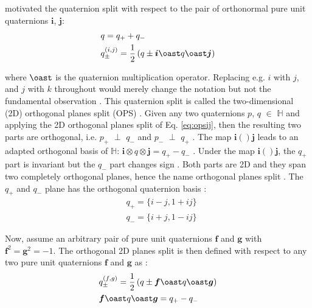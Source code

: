\documentclass[superscriptaddress,longbibliography,aps,prl,twocolumn,10pt]{revtex4-2}
\begin{document}
\noindent
motivated the quaternion split with respect to the pair of orthonormal pure unit quaternions $\boldsymbol{i}$, $\boldsymbol{j}$:
    \begin{equation} \label{eq:opsij}
    \begin{aligned}
        &q = q_{+}+q_{-} \\
        &q_{\pm}^{\left(i,j\right)} = \frac{1}{2} \left(q \pm \boldsymbol{i} \oast q \oast \boldsymbol{j} \right)
    \end{aligned}
    \end{equation}

\noindent
where $\oast$ is the quaternion multiplication operator. Replacing e.g. $i$ with $j$, and $j$ with $k$ throughout would merely change the notation but not the fundamental observation \cite{HitzerSangwine2013, Hitzer2015}. This quaternion split is called the two-dimensional (2D) orthogonal planes split (OPS) \cite{HitzerSangwine2013, Hitzer2015}. Given any two quaternions $p$, $q$ $\in$ $\mathbb{H}$ and applying the 2D orthogonal planes split of Eq. \ref{eq:opsij}, then the resulting two parts are orthogonal, i.e. $p_{+}$ $\perp$ $q_{-}$ and $p_{-}$ $\perp$ $q_{+}$ \cite{HitzerSangwine2013, Hitzer2015}. The map $\boldsymbol{i}()\boldsymbol{j}$ leads to an adapted orthogonal basis of $\mathbb{H}$: $\boldsymbol{i} \otimes q \otimes \boldsymbol{j} = q_{+} - q_{-}$ \cite{HitzerSangwine2013, Hitzer2015}. Under the map $\boldsymbol{i}()\boldsymbol{j}$, the $q_{+}$ part is invariant but the $q_{-}$ part changes sign \cite{HitzerSangwine2013, Hitzer2015}. Both parts are 2D and they span two completely orthogonal planes, hence the name orthogonal planes split \cite{HitzerSangwine2013, Hitzer2015}. The $q_{+}$ and $q_{-}$ plane has the orthogonal quaternion basis \cite{HitzerSangwine2013, Hitzer2015}:
    \begin{equation} \label{eq:basisij}
    \begin{aligned}
        &q_{+} = \{i-j,1+ij \}\\
        &q_{-} = \{i+j,1-ij \}
    \end{aligned}
    \end{equation}

\noindent
Now, assume an arbitrary pair of pure unit quaternions $\boldsymbol{f}$ and $\boldsymbol{g}$ with $\boldsymbol{f}^2 = \boldsymbol{g}^2 = -1$. The orthogonal 2D planes split is then defined with respect to any two pure unit quaternions $\boldsymbol{f}$ and $\boldsymbol{g}$ as \cite{HitzerSangwine2013, Hitzer2015}:
    \begin{equation} \label{eq:opsfg}
    \begin{aligned}
        &q_{\pm}^{\left(f,g\right)} = \frac{1}{2} \left(q \pm \boldsymbol{f} \oast q \oast \boldsymbol{g} \right)\\
        &\boldsymbol{f} \oast q \oast \boldsymbol{g} = q_{+}-q_{-}
    \end{aligned}
    \end{equation}
\end{document}
